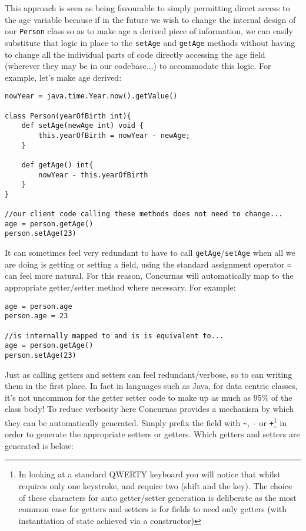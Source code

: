 \documentclass[conc-doc]{subfiles}
\begin{document}
This approach is seen as being favourable to simply permitting direct access to the age variable because if in the future we wish to change the internal design of our \lstinline{Person} class so as to make age a derived piece of information, we can easily substitute that logic in place to the \lstinline{setAge} and \lstinline{getAge} methods without having to change all the individual parts of code directly accessing the age field (wherever they may be in our codebase...) to accommodate this logic. For example, let's make age derived:

\begin{lstlisting}
nowYear = java.time.Year.now().getValue()

class Person(yearOfBirth int){
	def setAge(newAge int) void {
		this.yearOfBirth = nowYear - newAge;
	}
	
	def getAge() int{
		nowYear - this.yearOfBirth
	}
}

//our client code calling these methods does not need to change...
age = person.getAge()
person.setAge(23)
\end{lstlisting}

It can sometimes feel very redundant to have to call \lstinline{getAge}/\lstinline{setAge} when all we are doing is getting or setting a field, using the standard assignment operator \lstinline{=} can feel more natural. For this reason, Concurnas will automatically map to the appropriate getter/setter method where necessary. For example:

\begin{lstlisting}
age = person.age
person.age = 23

//is internally mapped to and is is equivalent to...
age = person.getAge()
person.setAge(23)
\end{lstlisting}

Just as calling getters and setters can feel redundant/verbose, so to can writing them in the first place. In fact in languages such as Java, for data centric classes, it's not uncommon for the getter setter code to make up as much as 95\% of the class body! To reduce verbosity here Concurnas provides a mechanism by which they can be automatically generated. Simply prefix the field with \lstinline{~}, \lstinline{-} or \lstinline{+}\footnote{In looking at a standard QWERTY keyboard you will notice that whilst \scantokens{\lstinline{-}} requires only one keystroke, \scantokens{\lstinline{~}} and \scantokens{\lstinline{+}} require two (shift and the \scantokens{\lstinline{+/~}} key). The choice of these characters for auto getter/setter generation is deliberate as the most common case for getters and setters is for fields to need only getters (with instantiation of state achieved via a constructor)} in order to generate the appropriate setters or getters. Which getters and setters are generated is below:
\end{document}
